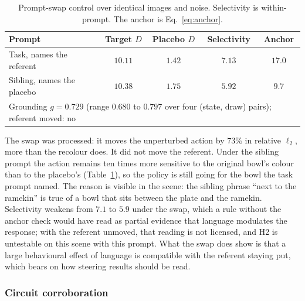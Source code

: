 \begin{table}[t]
\caption{Prompt-swap control over identical images and noise. Selectivity is
within-prompt. The anchor is Eq.~\ref{eq:anchor}.}
\label{tab:cf-prompt}
\begin{center}
\begin{tabular}{lcccc}
\hline
Prompt & Target $D$ & Placebo $D$ & Selectivity & Anchor \\
\hline
Task, names the referent      & $10.11$ & $1.42$ & $7.13$ & $17.0$ \\
Sibling, names the placebo    & $10.38$ & $1.75$ & $5.92$ & $9.7$ \\
\hline
\multicolumn{5}{p{5.1in}}{Grounding $g=0.729$ (range $0.680$ to $0.797$ over four (state, draw) pairs); referent moved: no} \\
\hline
\end{tabular}
\end{center}
\end{table}

The swap was processed: it moves the unperturbed action by $73\%$ in relative
$\ell_2$, more than the recolour does. It did not move the referent. Under the
sibling prompt the action remains ten times more sensitive to the original
bowl's colour than to the placebo's (Table~\ref{tab:cf-prompt}), so the policy
is still going for the bowl the task prompt named. The reason is visible in the
scene: the sibling phrase ``next to the ramekin'' is true of a bowl that sits
between the plate and the ramekin. Selectivity weakens from $7.1$ to $5.9$
under the swap, which a rule without the anchor check would have read as
partial evidence that language modulates the response; with the referent
unmoved, that reading is not licensed, and H2 is untestable on this scene with
this prompt. What the swap does show is that a large behavioural effect of
language is compatible with the referent staying put, which bears on how
steering results should be read.

\subsubsection{Circuit corroboration}

